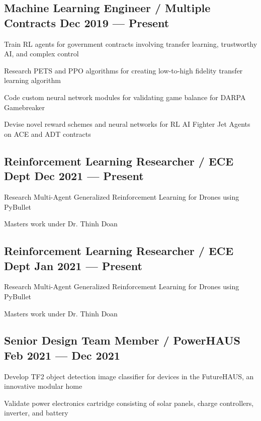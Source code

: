 \subsection{{Machine Learning Engineer / Multiple Contracts \hfill Dec 2019 --- Present}}
\begin{zitemize}
	\item Train RL agents for government contracts involving transfer learning, trustworthy AI, and complex control
	\item Research PETS and PPO algorithms for creating low-to-high fidelity transfer learning algorithm
	\item Code custom neural network modules for validating game balance for DARPA Gamebreaker
	\item Devise novel reward schemes and neural networks for RL AI Fighter Jet Agents on ACE and ADT contracts
\end{zitemize}

\subsection{{Reinforcement Learning Researcher / ECE Dept  \hfill Dec 2021 --- Present}}
\begin{zitemize}
	\item Research Multi-Agent Generalized Reinforcement Learning for Drones using PyBullet
	\item Masters work under Dr. Thinh Doan
\end{zitemize}

\subsection{{Reinforcement Learning Researcher / ECE Dept  \hfill Jan 2021 --- Present}}
\begin{zitemize}
	\item Research Multi-Agent Generalized Reinforcement Learning for Drones using PyBullet
	\item Masters work under Dr. Thinh Doan
\end{zitemize}

\subsection{{Senior Design Team Member / PowerHAUS \hfill Feb 2021 --- Dec 2021}}
\begin{zitemize}
	\item Develop TF2 object detection image classifier for devices in the FutureHAUS, an innovative modular home
	\item Validate power electronics cartridge consisting of solar panels, charge controllers, inverter, and battery
\end{zitemize}

